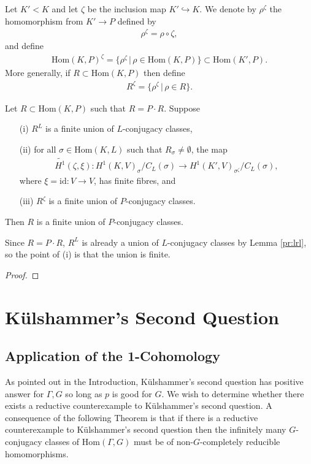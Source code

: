 \begin{definition} Let $K' < K$ and let $\zeta$ be the inclusion map $K' \hookrightarrow K$. We denote by $\rho^\zeta$ the homomorphism from $K' \rightarrow P$ defined by
	\begin{align*}
		\rho^\zeta = \rho \circ \zeta,
	\end{align*}
	and define
	\begin{align*}
		\mathrm{Hom}(K, P)^\zeta = \{ \rho^\zeta \,|\, \rho \in \mathrm{Hom}(K, P)\} \subset \mathrm{Hom}(K', P).
	\end{align*}
	More generally, if $R \subset \mathrm{Hom}(K, P)$ then define
	\begin{align*}
		R^\zeta = \{\rho^\zeta \,|\, \rho \in R\}.
	\end{align*}
\end{definition}

\begin{theorem} Let $R \subset \mathrm{Hom}(K, P)$ such that $R = P \cdot R$. Suppose
	\begin{itemize}
		\item[(i)] $R^L$ is a finite union of $L$-conjugacy classes,
		\item[(ii)] for all $\sigma \in \mathrm{Hom}(K, L)$ such that $R_\sigma \neq \emptyset$, the map
			\begin{align*}
				\widetilde{H^1}(\zeta, \xi):H^1(K, V)_\sigma/C_L(\sigma) \rightarrow H^1(K', V)_{\sigma^\zeta}/C_L(\sigma),
			\end{align*}
			where $\xi = \mathrm{id}:V \rightarrow V$, has finite fibres, and
		\item[(iii)] $R^\zeta$ is a finite union of $P$-conjugacy classes.
	\end{itemize}
	Then $R$ is a finite union of $P$-conjugacy classes.
\end{theorem}
\begin{remark}
	Since $R = P \cdot R$, $R^L$ is already a union of $L$-conjugacy classes by Lemma \ref{pr:lrl}, so the point of (i) is that the union is finite.
\end{remark}
\begin{proof}
\end{proof}

\section{K\"ulshammer's Second Question}
\subsection{Application of the 1-Cohomology}
As pointed out in the Introduction, K\"ulshammer's second question has positive answer for $\Gamma, G$ so long as $p$ is good for $G$. We wish to determine whether there exists a reductive counterexample to K\"ulshammer's second question.
A consequence of the following Theorem \cite[Theorem 1.2]{martin2003reductive} is that if there is a reductive counterexample to K\"ulshammer's second question then the infinitely many $G$-conjugacy classes of $\mathrm{Hom}(\Gamma, G)$ must be of non-$G$-completely reducible homomorphisms.

